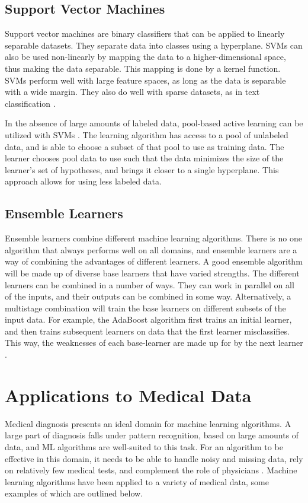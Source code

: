 \documentclass[draftcopy]{srpaper}
\begin{document}
\subsection{Support Vector Machines}
Support vector machines are binary classifiers that can be applied to linearly
separable datasets. They separate data into classes using a
hyperplane. SVMs can also be used non-linearly by mapping the data
to a higher-dimensional space, thus making the data separable. This
mapping is done by a kernel function. SVMs perform well with large feature
spaces, as long as the data is separable with a wide margin. They also
do well with sparse datasets, as in text classification \cite{Joa98}.

In the absence of large amounts of labeled data, pool-based active
learning can be utilized with SVMs \cite{TK01}. The learning
algorithm has access to a pool of unlabeled data, and is able to
choose a subset of that pool to use as training data. The learner
chooses pool data to use such that the data minimizes the size of
the learner's set of hypotheses,
and brings it closer to a single hyperplane. This approach allows for
using less labeled data.

\subsection{Ensemble Learners}
Ensemble learners combine different machine learning algorithms. There
is no one algorithm that always performs well on all domains, and
ensemble learners are a way of combining the advantages of different
learners. A good ensemble algorithm will be made up of diverse base
learners that have varied strengths. The different learners can be
combined in a number of ways. They can work in parallel on all of the inputs, and their
outputs can be combined in some way. Alternatively, a multistage combination will train the base
learners on different subsets of the input data. For example, the
AdaBoost algorithm
first trains an
initial learner, and then trains subsequent learners on data that the
first learner misclassifies. This way, the weaknesses of each
base-learner are made up for by the next learner \cite{FS95}.

\section{Applications to Medical Data}
Medical diagnosis presents an ideal domain for machine learning
algorithms. A large part of diagnosis falls under pattern recognition,
based on large amounts of data, and ML algorithms are well-suited to
this task. For an algorithm to be effective in this domain, it needs to be able to handle noisy and missing
data, rely on relatively few medical tests, and complement the role of
physicians \cite{Kon01}.
Machine learning algorithms have been applied to a variety of medical
data, some examples of which are outlined below.
\end{document}
